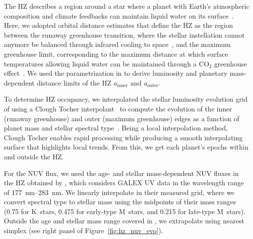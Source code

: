 \documentclass[twocolumn,twocolappendix,linenumbers]{aastex631}
\begin{document}
The \gls{HZ} describes a region around a star where a planet with Earth's atmospheric composition and climate feedbacks can maintain liquid water on its surface~\citep[e.g.,][]{Ramirez2017,Ramirez2018,MolLous2022,Spinelli2023,Tuchow2023}.
Here, we adopted orbital distance estimates that define the \gls{HZ} as the region between the runaway greenhouse transition, where the stellar instellation cannot anymore be balanced through infrared cooling to space~\citep{Ingersoll1969}, and the maximum greenhouse limit, corresponding to the maximum distance at which surface temperatures allowing liquid water can be maintained through a CO$_2$ greenhouse effect~\citep{Kasting1991,Kasting1993,Underwood2003,Kopparapu2013,Kopparapu2014}.
We used the parametrization in \citet{Kopparapu2014} to derive luminosity and planetary mass-dependent distance limits of the \gls{HZ} $a_\mathrm{inner}$ and $a_\mathrm{outer}$.


To determine \gls{HZ} occupancy, we interpolated the stellar luminosity evolution grid of \citet{Baraffe1998} using a Clough Tocher interpolant~\citep[][see left panel of Figure~\ref{fig:hz_nuv_evo}]{Nielson1983,Alfeld1984} to compute the evolution of the inner (runaway greenhouse) and outer (maximum greenhouse) edges as a function of planet mass and stellar spectral type~\citep{Kopparapu2014}.
Being a local interpolation method, Clough Tocher enables rapid processing while producing a smooth interpolating surface that highlights local trends.
From this, we get each planet's epochs within and outside the \gls{HZ}.

For the \gls{NUV} flux, we used the age- and stellar mass-dependent \gls{NUV} fluxes in the \gls{HZ} obtained by \citet{Richey-Yowell2023}, which considers GALEX UV data in the wavelength range of \SIrange{177}{283}{\nano\meter}.
We linearly interpolate in their measured grid, where we convert spectral type to stellar mass using the midpoints of their mass ranges (\SI{0.75}{\Msun} for K~stars, \SI{0.475}{\Msun} for early-type M~stars,  and \SI{0.215}{\Msun} for late-type M~stars).
Outside the age and stellar mass range covered in \citet{Richey-Yowell2023}, we extrapolate using nearest simplex (see right panel of Figure~\ref{fig:hz_nuv_evo}).
\end{document}
